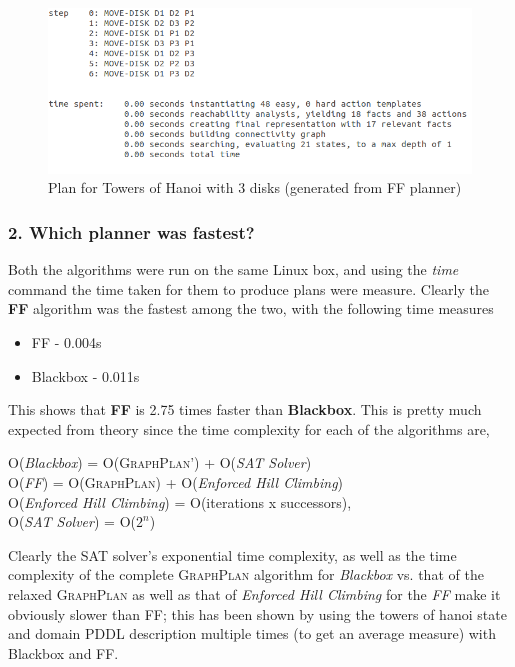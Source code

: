 \documentclass[10pt, letter]{article}
\begin{document}
\begin{figure}[h!]
  \centering
    \includegraphics[scale = 0.5]{images/hanoi-3}
    \caption{Plan for Towers of Hanoi with 3 disks (generated from FF planner)}
  \label{plan1}
\end{figure}

\subsubsection*{2. Which planner was fastest?}
\label{subsubsec_2}
Both the algorithms were run on the same Linux box, and using the \textit{time} command the time taken for them to produce plans were measure. Clearly the \textbf{FF} algorithm was the fastest among the two, with the following time measures \\
\begin{itemize}
\item FF - 0.004s
\item Blackbox - 0.011s
\end{itemize}
This shows that \textbf{FF} is 2.75 times faster than \textbf{Blackbox}. This is pretty much expected from theory since the time complexity for each of the algorithms are,
\begin{center}
	O(\textit{Blackbox}) = O(\textsc{GraphPlan'}) + O(\textit{SAT Solver})\\
	O(\textit{FF}) = O(\textsc{GraphPlan}) + O(\textit{Enforced Hill Climbing})\\
	O(\textit{Enforced Hill Climbing}) = O(iterations x successors),\\
	O(\textit{SAT Solver}) = O($2^n$)
\end{center}
Clearly the SAT solver's exponential time complexity, as well as the time complexity of the complete \textsc{GraphPlan} algorithm for \textit{Blackbox} vs. that of the relaxed \textsc{GraphPlan} as well as that of \textit{Enforced Hill Climbing} for the \textit{FF} make it obviously slower than FF; this has been shown by using the towers of hanoi state and domain PDDL description multiple times (to get an average measure) with Blackbox and FF.
\end{document}
